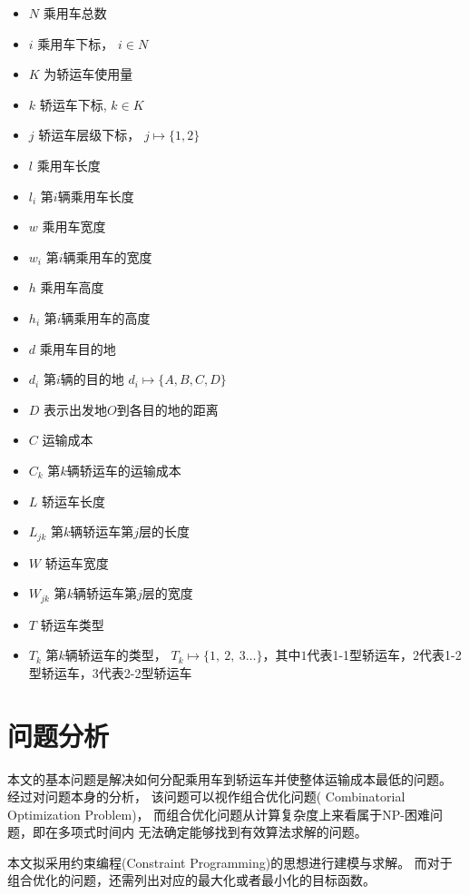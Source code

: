 \documentclass[UTF8，12pt]{ctexart}
\begin{document}
	\begin{itemize}
		\item $N$ 乘用车总数
		\item $i$ 乘用车下标， $i \in N$
		\item $K$ 为轿运车使用量
		\item $k$ 轿运车下标,  $k \in K$
		\item $j$ 轿运车层级下标， $j \mapsto \{1,2\}$
		\item $l$ 乘用车长度
		\item $l_i$ 第$i$辆乘用车长度
		\item $w$ 乘用车宽度
		\item $w_i$ 第$i$辆乘用车的宽度
		\item $h$ 乘用车高度
		\item $h_i$ 第$i$辆乘用车的高度
		\item $d$ 乘用车目的地
		\item $d_i$ 第$i$辆的目的地 $d_i \mapsto \{A, B, C, D\}$
		\item $D$ 表示出发地$O$到各目的地的距离
		\item $C$ 运输成本
		\item $C_k$ 第$k$辆轿运车的运输成本
		\item $L$ 轿运车长度
		\item $L_{jk}$ 第$k$辆轿运车第$j$层的长度
		\item $W$ 轿运车宽度
		\item $W_{jk}$ 第$k$辆轿运车第$j$层的宽度
		\item $T$ 轿运车类型
		\item $T_k$ 第$k$辆轿运车的类型， $T_k \mapsto \{1, ~2, ~3 \dots \}$，其中$1$代表1-1型轿运车，$2$代表1-2型轿运车，$3$代表2-2型轿运车
		
		
	\end{itemize}


\section{问题分析}
本文的基本问题是解决如何分配乘用车到轿运车并使整体运输成本最低的问题。
经过对问题本身的分析，
该问题可以视作组合优化问题( Combinatorial Optimization Problem)，
而组合优化问题从计算复杂度上来看属于NP-困难问题，即在多项式时间内
无法确定能够找到有效算法求解的问题。

本文拟采用约束编程(Constraint Programming)的思想进行建模与求解。
而对于组合优化的问题，还需列出对应的最大化或者最小化的目标函数。
\end{document}
